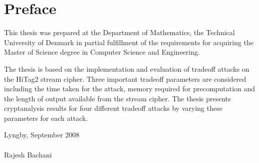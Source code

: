 
\chapter*{Preface}

This thesis was prepared at the Department of Mathematics, the Technical University of Denmark in partial fulfillment of the requirements for acquiring the Master of Science degree in Computer Science and Engineering.

The thesis is based on the implementation and evaluation of tradeoff attacks on the HiTag2 stream cipher. Three important tradeoff parameters are considered including the time taken for the attack, memory required for precomputation and the length of output available from the stream cipher. The thesis presents cryptanalysis results for four different tradeoff attacks by varying these parameters for each attack. 

\vspace{20mm}
\mbox{}\hfill
\begin{minipage}[t]{80mm}
Lyngby, September 2008\\
 \\
Rajesh Bachani
\end{minipage}
